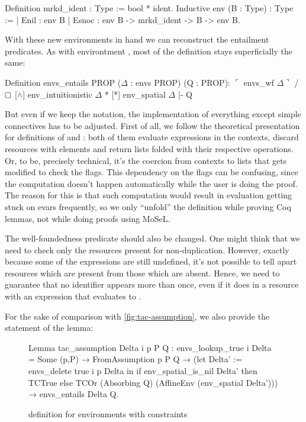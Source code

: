 \begin{coq}
  Definition mrkd_ident : Type := bool * ident.
  Inductive env (B : Type) : Type :=
  | Enil : env B
  | Esnoc : env B -> mrkd_ident -> B -> env B.
\end{coq}

With these new environments in hand we can reconstruct the entailment predicates.
As with environtment , most of the definition stays superficially the same:
\begin{coq}
  Definition envs_entails {PROP} ($\Delta$ : envs PROP) (Q : PROP):
  $\ulcorner$ envs_wf $\Delta \urcorner$ /\ $\mathop{\Box}$ [$\wedge$] env_intuitionistic $\Delta$ * [*] env_spatial $\Delta$ |- Q
\end{coq}

But even if we keep the notation, the implementation of everything except simple connectives has to be adjusted.
First of all, we follow the theoretical presentation for definitions of \coqe{[$\wedge$]} and \coqe{[*]}: both of them evaluate expressions in the contexts, discard resources with \false elements and return lists folded with their respective operations.
Or, to be, precisely technical, it's the coercion from contexts to lists that gets modified to check the flags.
This dependency on the flags can be confusing, since the computation doesn't happen automatically while the user is doing the proof.
The reason for this is that such computation would result in evaluation getting stuck on evars frequently, so we only ``unfold'' the definition while proving Coq lemmas, not while doing proofs using MoSeL.

The well-foundedness predicate should also be changed.
One might think that we need to check only the resources present for non-duplication.
However, exactly because some of the expressions are still undefined, it's not possible to tell apart resources which are present from those which are absent.
Hence, we need to guarantee that no identifier appears more than once, even if it does in a resource with an expression that evaluates to \false.

For the sake of comparison with \ref{fig:tac-assumption}, we also provide the statement of the  lemma:

\begin{figure}[H]
  \begin{coq}
Lemma tac_assumption Delta i p P Q :
  envs_lookup_true i Delta = Some (p,P) →
  FromAssumption p P Q →
  (let Delta' := envs_delete true i p Delta in
   if env_spatial_is_nil Delta' then TCTrue
   else TCOr (Absorbing Q) (AffineEnv (env_spatial Delta'))) →
  envs_entails Delta Q.
  \end{coq}
  \caption{ definition for environments with constraints}
  \label{fig:tac-assumption-constr}
\end{figure}

